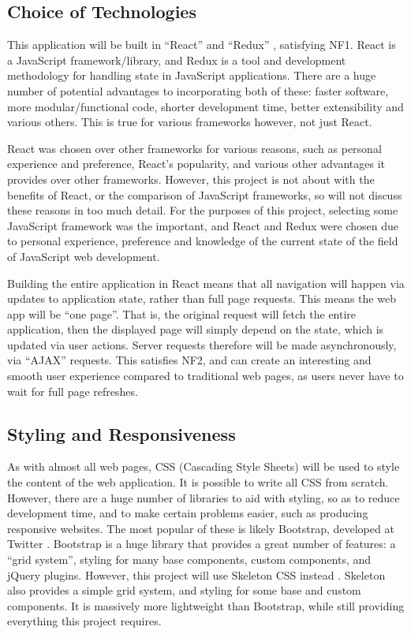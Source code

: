 \documentclass[11pt,openright,a4paper]{report}
\begin{document}
\subsection{Choice of Technologies}
This application will be built in \enquote{React} \parencite{react} and \enquote{Redux} \parencite{redux}, satisfying NF1. React is a JavaScript framework/library, and Redux is a tool and development methodology for handling state in JavaScript applications. There are a huge number of potential advantages to incorporating both of these: faster software, more modular/functional code, shorter development time, better extensibility and various others. This is true for various frameworks however, not just React. 

React was chosen over other frameworks for various reasons, such as personal experience and preference, React's popularity, and various other advantages it provides over other frameworks. However, this project is not about with the benefits of React, or the comparison of JavaScript frameworks, so will not discuss these reasons in too much detail. For the purposes of this project, selecting some JavaScript framework was the important, and React and Redux were chosen due to personal experience, preference and knowledge of the current state of the field of JavaScript web development.

Building the entire application in React means that all navigation will happen via updates to application state, rather than full page requests. This means the web app will be \enquote{one page}. That is, the original request will fetch the entire application, then the displayed page will simply depend on the state, which is updated via user actions. Server requests therefore will be made asynchronously, via \enquote{AJAX} requests. This satisfies NF2, and can create an interesting and smooth user experience compared to traditional web pages, as users never have to wait for full page refreshes.

\subsection{Styling and Responsiveness}
As with almost all web pages, CSS (Cascading Style Sheets) will be used to style the content of the web application. It is possible to write all CSS from scratch. However, there are a huge number of libraries to aid with styling, so as to reduce development time, and to make certain problems easier, such as producing responsive websites. The most popular of these is likely Bootstrap, developed at Twitter \parencite{bootstrapcss}. Bootstrap is a huge library that provides a great number of features: a \enquote{grid system}, styling for many base components, custom components, and jQuery plugins. However, this project will use Skeleton CSS instead \parencite{skeletoncss}. Skeleton also provides a simple grid system, and styling for some base and custom components. It is massively more lightweight than Bootstrap, while still providing everything this project requires.
\end{document}
